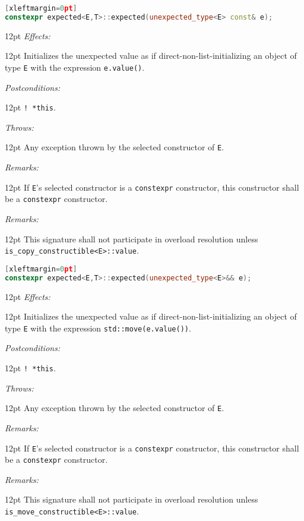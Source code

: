 \documentclass[a4paper,10pt]{article}
\newcommand{\cpp}[1]{\lstinline{#1}}
\newcommand{\wordingItem}[1]{\noindent\textit{#1:}}
\newenvironment{wordingTextItem}[1]{\wordingItem{#1}\vspace{2pt}\noindent\begin{adjustwidth}{12pt}{}}{\vspace{2pt}\end{adjustwidth}}
\newenvironment{wordingPara}{\begin{adjustwidth}{12pt}{}}{\end{adjustwidth}}
\begin{document}
\begin{lstlisting}[language=C++][xleftmargin=0pt]
constexpr expected<E,T>::expected(unexpected_type<E> const& e);
\end{lstlisting}
\begin{wordingPara}
\begin{wordingTextItem}{Effects}
Initializes the unexpected value as if direct-non-list-initializing an object of type \cpp{E} with the expression \cpp{e.value()}.
\end{wordingTextItem}
\begin{wordingTextItem}{Postconditions}
\cpp{! *this}.
\end{wordingTextItem}
\begin{wordingTextItem}{Throws}
Any exception thrown by the selected constructor of \cpp{E}.
\end{wordingTextItem}
\begin{wordingTextItem}{Remarks}
If \cpp{E}'s selected constructor is a \cpp{constexpr} constructor, this constructor shall be a \cpp{constexpr} constructor.
\end{wordingTextItem}
\begin{wordingTextItem}{Remarks}
This signature shall not participate in overload resolution unless\\
\cpp{is_copy_constructible<E>::value}. 
\end{wordingTextItem}
\end{wordingPara}

\begin{lstlisting}[language=C++][xleftmargin=0pt]
constexpr expected<E,T>::expected(unexpected_type<E>&& e); 
\end{lstlisting}
\begin{wordingPara}
\begin{wordingTextItem}{Effects}
Initializes the unexpected value as if direct-non-list-initializing an object of type \cpp{E} with the expression \cpp{std::move(e.value())}.
\end{wordingTextItem}
\begin{wordingTextItem}{Postconditions}
\cpp{! *this}.
\end{wordingTextItem}
\begin{wordingTextItem}{Throws}
Any exception thrown by the selected constructor of \cpp{E}.
\end{wordingTextItem}
\begin{wordingTextItem}{Remarks}
If \cpp{E}'s selected constructor is a \cpp{constexpr} constructor, this constructor shall be a \cpp{constexpr} constructor.
\end{wordingTextItem}
\begin{wordingTextItem}{Remarks}
This signature shall not participate in overload resolution unless\\
\cpp{is_move_constructible<E>::value}.
\end{wordingTextItem}
\end{wordingPara}
\end{document}
